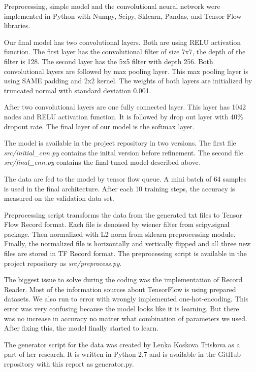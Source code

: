 \documentclass{article}
\begin{document}
Preprocessing, simple model and the convolutional neural network were
implemented in Python with Numpy, Scipy, Sklearn, Pandas, and Tensor
Flow libraries.

Our final model has two convolutional layers. Both are using RELU
activation function. The first layer has the convolutional filter of
size 7x7, the depth of the filter is 128. The second layer has the 5x5
filter with depth 256. Both convolutional layers are followed by max
pooling layer. This max pooling layer is using SAME padding and 2x2
kernel. The weights of both layers are initialized by truncated normal
with standard deviation 0.001.

After two convolutional layers are one fully connected layer. This layer
has 1042 nodes and RELU activation function. It is followed by drop out
layer with 40\% dropout rate. The final layer of our model is the
softmax layer.

The model is available in the project repository in two versions. The first file \textit{src/initial\_cnn.py} contains the inital version before refinement.
The second file \textit{src/final\_cnn.py} contains the final tuned model described above. 

The data are fed to the model by tensor flow queue. A mini batch of 64
samples is used in the final architecture. After each 10 training steps,
the accuracy is measured on the validation data set.

Preprocessing script transforms the data from the generated txt files to
Tensor Flow Record format. Each file is denoised by wiener filter from
scipy.signal package. Then normalized with L2 norm from sklearn
preprocessing module. Finally, the normalized file is horizontally and
vertically flipped and all three new files are stored in TF Record
format. The preprocessing script is available in the project repository
as \textit{src/preprocess.py}.


The biggest issue to solve during the coding was the implementation of Record
Reader. Most of the information sources   about TensorFlow is using prepared
datasets. We also run to error with wrongly implemented one-hot-encoding. This
error was very confusing because the model looks like it is learning. But there
was no increase in accuracy no matter what combination of parameters we used.
After fixing this, the model finally started to learn.

The generator script for the data was created by Lenka Koskova Triskova
as a part of her research. It is written in Python 2.7 and is available
in the GitHub repository with this report as generator.py.
\end{document}

